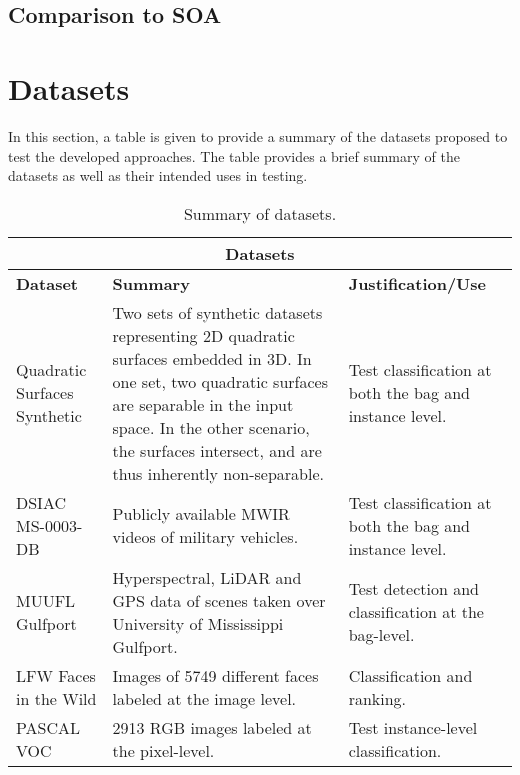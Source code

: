 \subsection{Comparison to SOA}

\section{Datasets}
In this section, a table is given to provide a summary of the datasets proposed to test the developed approaches.  The table provides a brief summary of the datasets as well as their intended uses in testing.

\begin{longtable}{ |p{4cm}|p{6cm}|p{4cm}|  } 
	\caption{Summary of datasets.}
	\label{tab:Datasets}\\
	\hline
	\multicolumn{3}{|c|}{\textbf{Datasets}} \\
	\hline
	\textbf{Dataset} & \textbf{Summary} & \textbf{Justification/Use}\\
	\hline
	Quadratic Surfaces Synthetic   &  Two sets of synthetic datasets representing 2D quadratic surfaces embedded in 3D.  In one set, two quadratic surfaces are separable in the input space.  In the other scenario, the surfaces intersect, and are thus inherently non-separable.  & Test classification at both the bag and instance level.   \\
	\hline
	DSIAC MS-0003-DB   &  Publicly available MWIR videos of military vehicles. & Test classification at both the bag and instance level.   \\
	\hline
	MUUFL Gulfport &  Hyperspectral, LiDAR and GPS data of scenes taken over University of Mississippi Gulfport. & Test detection and classification at the bag-level.   \\
	\hline
	LFW Faces in the Wild & Images of 5749 different faces labeled at the  image level. & Classification and ranking. \\
	\hline
	PASCAL VOC  & 2913 RGB images labeled at the pixel-level. & Test instance-level classification. \\
	\hline
\end{longtable}